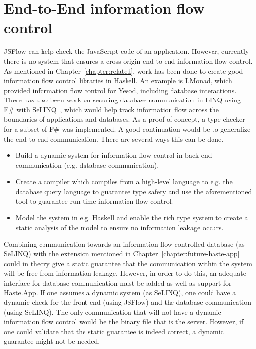 \section{End-to-End information flow control}
JSFlow can help check the JavaScript code of an application. However, currently there is no system that ensures a cross-origin end-to-end information flow control. As mentioned in Chapter~\ref{chapter:related}, work has been done to create good information flow control libraries in Haskell. An example is LMonad, which provided information flow control for Yesod, including database interactions. There has also been work on securing database communication in LINQ using F\# with SeLINQ~\cite{selinq}, which would help track information flow across the boundaries of applications and databases. As a proof of concept, a type checker for a subset of F\# was implemented. A good continuation would be to generalize the end-to-end communication. There are several ways this can be done.
\begin{itemize}
  \item Build a dynamic system for information flow control in back-end communication (e.g. database communication).
  \item Create a compiler which compiles from a high-level language to e.g. the database query language to guarantee type safety and use the aforementioned tool to guarantee run-time information flow control.
  \item Model the system in e.g. Haskell and enable the rich type system to create a static analysis of the model to ensure no information leakage occurs.
\end{itemize}
Combining communication towards an information flow controlled database (as SeLINQ) with the extension mentioned in Chapter~\ref{chapter:future-haste-app} could in theory give a static guarantee that the communication within the system will be free from information leakage. However, in order to do this, an adequate interface for database communication must be added as well as support for Haste.App. If one assumes a dynamic system (as SeLINQ), one could have a dynamic check for the front-end (using JSFlow) and the database communication (using SeLINQ). The only communication that will not have a dynamic information flow control would be the binary file that is the server. However, if one could validate that the static guarantee is indeed correct, a dynamic guarantee might not be needed.
